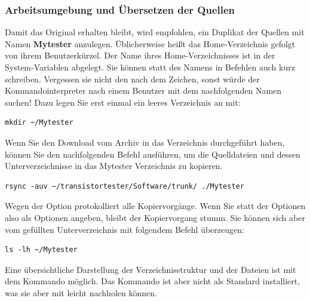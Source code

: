 \subsubsection{Arbeitsumgebung und Übersetzen der Quellen}
\label{sec:Arbeitsumgebung}
Damit das Original erhalten bleibt,
wird empfohlen, ein Duplikat der Quellen mit Namen \textbf {Mytester} anzulegen.
Üblicherweise heißt das Home-Verzeichnis  gefolgt von ihrem Benutzerkürzel.
Der Name ihres Home-Verzeichnisses ist in der System-Variablen  abgelegt.
Sie können statt des Namens in Befehlen auch kurz \lname{\textasciitilde/} schreiben.
Vergessen sie nicht den \lname{/} nach dem \lname{\textasciitilde} Zeichen, sonst würde der
Kommandointerpreter nach einem Benutzer mit dem nachfolgenden Namen suchen!
Dazu legen Sie erst einmal ein leeres Verzeichnis an mit:
\begin{large} \vspace{-0.4em} \begin{verbatim}
mkdir ~/Mytester
\end{verbatim} \end{large}
Wenn Sie den Download vom Archiv in das Verzeichnis   durchgeführt haben,
können Sie den nachfolgenden Befehl ausführen, um die Quelldateien und dessen Unterverzeichnisse
in das Mytester Verzeichnis zu kopieren.
\begin{large} \vspace{-0.4em} \begin{verbatim}
rsync -auv ~/transistortester/Software/trunk/ ./Mytester
\end{verbatim} \end{large}
Wegen der  Option protokolliert  alle Kopiervorgänge.
Wenn Sie statt der  Optionen also  als Optionen angeben,
bleibt der Kopiervorgang stumm.
Sie können sich aber vom gefüllten Unterverzeichnis mit folgendem Befehl
überzeugen:
\begin{large} \vspace{-0.4em} \begin{verbatim}
ls -lh ~/Mytester
\end{verbatim} \end{large}
Eine übersichtliche Darstellung der Verzeichnisstruktur und der Dateien ist mit
dem Kommando  möglich. Das Kommando ist aber nicht als
Standard installiert, was sie aber mit  leicht nachholen können.\\
